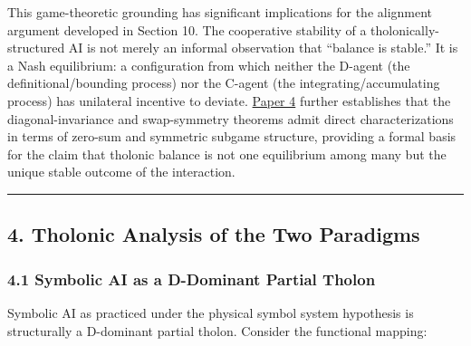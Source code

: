 \documentclass[
  11pt,
  letterpaper,
]{article}
\begin{document}
This game-theoretic grounding has significant implications for the
alignment argument developed in Section 10. The cooperative stability of
a tholonically-structured AI is not merely an informal observation that
``balance is stable.'' It is a Nash equilibrium: a configuration from
which neither the D-agent (the definitional/bounding process) nor the
C-agent (the integrating/accumulating process) has unilateral incentive
to deviate.
\href{https://github.com/baardev/truevalue/blob/main/docnav/Research/papers/4_game-theoretic-triadic-balance/4_game-theoretic-triadic-balance.pdf}{Paper
4} further establishes that the diagonal-invariance and swap-symmetry
theorems admit direct characterizations in terms of zero-sum and
symmetric subgame structure, providing a formal basis for the claim that
tholonic balance is not one equilibrium among many but the unique stable
outcome of the interaction.

\begin{center}\rule{0.5\linewidth}{0.5pt}\end{center}

\subsection{4. Tholonic Analysis of the Two
Paradigms}\label{tholonic-analysis-of-the-two-paradigms}

\subsubsection{4.1 Symbolic AI as a D-Dominant Partial
Tholon}\label{symbolic-ai-as-a-d-dominant-partial-tholon}

Symbolic AI as practiced under the physical symbol system hypothesis is
structurally a D-dominant partial tholon. Consider the functional
mapping:
\end{document}
